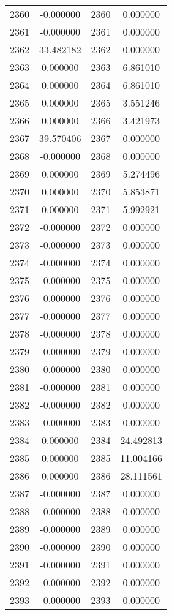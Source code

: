\documentclass[12pt]{article}
\begin{document}
\begin{longtable}{@{}cccc@{}}
2360 & -0.000000 & 2360 & 0.000000 \\
2361 & -0.000000 & 2361 & 0.000000 \\
2362 & 33.482182 & 2362 & 0.000000 \\
2363 & 0.000000 & 2363 & 6.861010 \\
2364 & 0.000000 & 2364 & 6.861010 \\
2365 & 0.000000 & 2365 & 3.551246 \\
2366 & 0.000000 & 2366 & 3.421973 \\
2367 & 39.570406 & 2367 & 0.000000 \\
2368 & -0.000000 & 2368 & 0.000000 \\
2369 & 0.000000 & 2369 & 5.274496 \\
2370 & 0.000000 & 2370 & 5.853871 \\
2371 & 0.000000 & 2371 & 5.992921 \\
2372 & -0.000000 & 2372 & 0.000000 \\
2373 & -0.000000 & 2373 & 0.000000 \\
2374 & -0.000000 & 2374 & 0.000000 \\
2375 & -0.000000 & 2375 & 0.000000 \\
2376 & -0.000000 & 2376 & 0.000000 \\
2377 & -0.000000 & 2377 & 0.000000 \\
2378 & -0.000000 & 2378 & 0.000000 \\
2379 & -0.000000 & 2379 & 0.000000 \\
2380 & -0.000000 & 2380 & 0.000000 \\
2381 & -0.000000 & 2381 & 0.000000 \\
2382 & -0.000000 & 2382 & 0.000000 \\
2383 & -0.000000 & 2383 & 0.000000 \\
2384 & 0.000000 & 2384 & 24.492813 \\
2385 & 0.000000 & 2385 & 11.004166 \\
2386 & 0.000000 & 2386 & 28.111561 \\
2387 & -0.000000 & 2387 & 0.000000 \\
2388 & -0.000000 & 2388 & 0.000000 \\
2389 & -0.000000 & 2389 & 0.000000 \\
2390 & -0.000000 & 2390 & 0.000000 \\
2391 & -0.000000 & 2391 & 0.000000 \\
2392 & -0.000000 & 2392 & 0.000000 \\
2393 & -0.000000 & 2393 & 0.000000 \\

\end{longtable}
\end{document}
